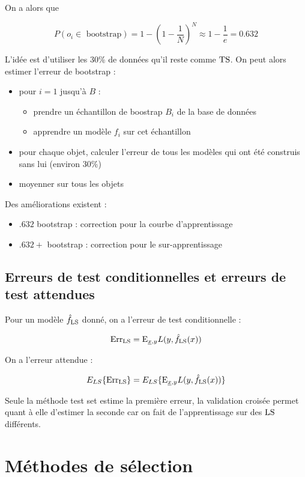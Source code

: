 	
	On a alors que
	
	$$P(o_i \in \text{ bootstrap}) = 1 - (1 - \frac{1}{N})^N \approx 1 - \frac{1}{e} = 0.632$$
	
	L'idée est d'utiliser les 30\% de données qu'il reste comme $\text{TS}$. On peut alors estimer l'erreur de bootstrap :
	
	\begin{itemize}
		\item pour $i = 1$ jusqu'à $B$ :
		
		\begin{itemize}
			\item prendre un échantillon de boostrap $B_i$ de la base de données
			\item apprendre un modèle $f_i$ sur cet échantillon
		\end{itemize}
		
		\item pour chaque objet, calculer l'erreur de tous les modèles qui ont été construis sans lui (environ 30\%)
		\item moyenner sur tous les objets
	\end{itemize}
	
	Des améliorations existent :
	
	\begin{itemize}
		\item $.632$ bootstrap : correction pour la courbe d'apprentissage
		\item $.632+$ bootstrap : correction pour le sur-apprentissage
	\end{itemize}
	
	\subsection{Erreurs de test conditionnelles et erreurs de test attendues}
	
	Pour un modèle $\hat{f}_{\text{LS}}$ donné, on a l'erreur de test conditionnelle :
	
	$$\text{Err}_{\text{LS}} = \text{E}_{\underline{x}, y}{L(y, \hat{f}_{\text{LS}}(x))}$$
	
	On a l'erreur attendue :
	
	$$E_{LS}\{\text{Err}_{\text{LS}}\} = E_{LS}\{\text{E}_{\underline{x}, y}{L(y, \hat{f}_{\text{LS}}(x))}\}$$
	
	Seule la méthode test set estime la première erreur, la validation croisée permet quant à elle d'estimer la seconde car on fait de l'apprentissage sur des $\text{LS}$ différents.
	
\section{Méthodes de sélection}

